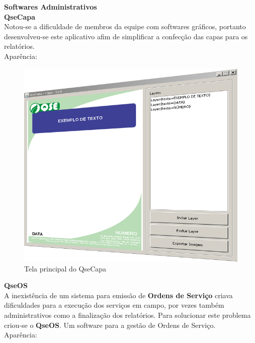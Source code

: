 \documentclass[12pt,a4paper,oneside,sumario=tradicional,brazil]{abntex2}
\begin{document}
\textbf{{\Large Softwares Administrativos}} \\
\indent
\textbf{{\large QseCapa}} \\
\indent
Notou-se a dificuldade de membros da equipe com softwares gráficos, portanto desenvolveu-se este aplicativo afim de simplificar a confecção das capas para os relatórios. \\
\indent
Aparência: \\
\begin{figure}[H]
	\centering
	\includegraphics[width=0.4\linewidth]{imgs/QseCapa-aparencia-perspectiva.PNG}
	\caption{Tela principal do QseCapa}
\end{figure}
\indent
\textbf{{\large QseOS}} \\
\indent
A inexistência de um sistema para emissão de \textbf{Ordens de Serviço} criava dificuldades para a execução dos serviços em campo, por vezes também administrativos como a finalização dos relatórios. Para solucionar este problema criou-se o \textbf{QseOS}. Um software para a gestão de Ordens de Serviço. \\
\indent
Aparência: \\
\end{document}
